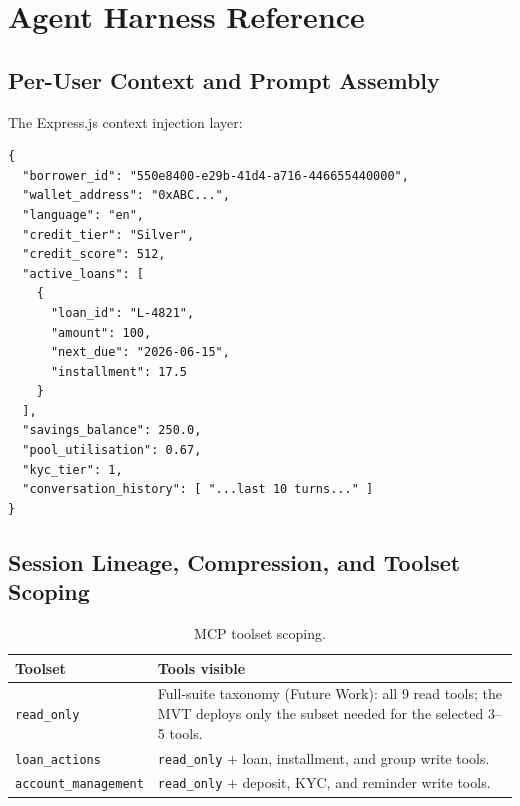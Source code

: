 \section{Agent Harness Reference}
\label{app:agent-harness}

\subsection{Per-User Context and Prompt Assembly}

The Express.js context injection layer:

\begin{verbatim}
{
  "borrower_id": "550e8400-e29b-41d4-a716-446655440000",
  "wallet_address": "0xABC...",
  "language": "en",
  "credit_tier": "Silver",
  "credit_score": 512,
  "active_loans": [
    {
      "loan_id": "L-4821",
      "amount": 100,
      "next_due": "2026-06-15",
      "installment": 17.5
    }
  ],
  "savings_balance": 250.0,
  "pool_utilisation": 0.67,
  "kyc_tier": 1,
  "conversation_history": [ "...last 10 turns..." ]
}
\end{verbatim}

\subsection{Session Lineage, Compression, and Toolset Scoping}

\begin{table}[H]
\centering
\caption[MCP toolset scoping]{MCP toolset scoping.}
\label{tab:agent-toolsets}
\begin{tabular}{p{3.5cm}p{9cm}}
\toprule
\tableheadcolor
\textbf{Toolset} & \textbf{Tools visible} \\
\midrule
\texttt{read\_only} & Full-suite taxonomy (Future Work): all 9 read tools; the MVT deploys only the subset needed for the selected 3--5 tools. \\
\texttt{loan\_actions} & \texttt{read\_only} $+$ loan, installment, and group write tools. \\
\texttt{account\_management} & \texttt{read\_only} $+$ deposit, KYC, and reminder write tools. \\
\bottomrule
\end{tabular}
\end{table}

